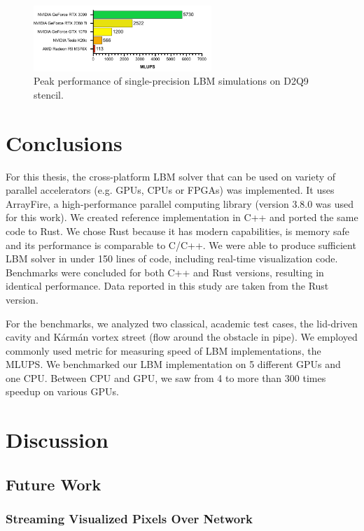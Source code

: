 \begin{figure}[!ht]
	\centering
	\includegraphics[width=0.6\textwidth]{data/max_mlups_2d.pdf}
	\caption{Peak performance of single-precision LBM simulations on D2Q9 stencil.}
	\label{fig:max_mlups}
\end{figure}

\section{Conclusions}

For this thesis, the cross-platform LBM solver that can be used on variety of parallel accelerators (e.g. GPUs, CPUs or FPGAs) was implemented. It uses ArrayFire, a high-performance parallel computing library (version 3.8.0 was used for this work). We created reference implementation in C++ and ported the same code to Rust. We chose Rust because it has modern capabilities, is memory safe and its performance is comparable to C/C++. We were able to produce sufficient LBM solver in under 150 lines of code, including real-time visualization code. Benchmarks were concluded for both C++ and Rust versions, resulting in identical performance. Data reported in this study are taken from the Rust version. 

For the benchmarks, we analyzed two classical, academic test cases, the lid-driven cavity and Kármán vortex street (flow around the obstacle in pipe). We employed commonly used metric for measuring speed of LBM implementations, the MLUPS. We benchmarked our LBM implementation on 5 different GPUs and one CPU. Between CPU and GPU, we saw from 4 to more than 300 times speedup on various GPUs.

\section{Discussion}

\subsection{Future Work}

\subsubsection{Streaming Visualized Pixels Over Network}

